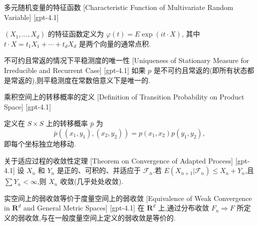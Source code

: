 \documentclass[UTF8]{ctexart}
\begin{document}
    
    
    \begin{dfn}
        {多元随机变量的特征函数}
        [Characteristic Function of Multivariate Random Variable]
        [gpt-4.1]
        
$( X _ { 1 } , \ldots , X _ { d } )$ 的特征函数定义为 $\varphi ( t ) = E \exp ( i t \cdot X )$, 其中 $t \cdot X = t _ { 1 } X _ { 1 } + \cdots + t _ { d } X _ { d }$ 是两个向量的通常点积.

    \end{dfn}
    
    
    
    \begin{thm}
        {不可约且常返的情况下平稳测度的唯一性}
        [Uniqueness of Stationary Measure for Irreducible and Recurrent Case]
        [gpt-4.1]
        如果 $p$ 是不可约且常返的(即所有状态都是常返的),则平稳测度在常数倍意义下是唯一的.
    \end{thm}
    
    
    
    \begin{dfn}
        {乘积空间上的转移概率的定义}
        [Definition of Transition Probability on Product Space]
        [gpt-4.1]
        
定义在 $S \times S$ 上的转移概率 $\bar{p}$ 为
\[
\bar{p}((x_{1}, y_{1}), (x_{2}, y_{2})) = p(x_{1}, x_{2}) p(y_{1}, y_{2}),
\]
即每个坐标独立地移动.

    \end{dfn}
    
    
    
    \begin{thm}
        {关于适应过程的收敛性定理}
        [Theorem on Convergence of Adapted Process]
        [gpt-4.1]
        设 $X_n$ 和 $Y_n$ 是正的、可积的、并适应于 ${\mathcal{F}}_n$.若 $E(X_{n+1} | {\mathcal{F}}_n) \leq X_n + Y_n$,且 $\sum Y_n < \infty$,则 $X_n$ 收敛(几乎处处收敛).
    \end{thm}
    
    
    
    \begin{thm}
        {实空间上的弱收敛等价于度量空间上的弱收敛}
        [Equivalence of Weak Convergence in $\mathbf{R}^d$ and General Metric Spaces]
        [gpt-4.1]
        在 $\mathbf{R}^d$ 上,通过分布收敛 $F_n \Rightarrow F$ 所定义的弱收敛,与在一般度量空间上定义的弱收敛是等价的.
    \end{thm}
    
\end{document}
